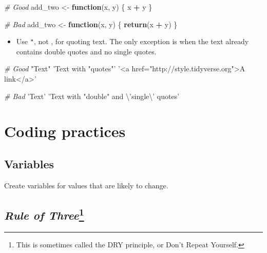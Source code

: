 \documentclass[]{book}
\newenvironment{Shaded}{\begin{snugshade}}{\end{snugshade}}
\newcommand{\KeywordTok}[1]{\textcolor[rgb]{0.13,0.29,0.53}{\textbf{#1}}}
\newcommand{\CharTok}[1]{\textcolor[rgb]{0.31,0.60,0.02}{#1}}
\newcommand{\StringTok}[1]{\textcolor[rgb]{0.31,0.60,0.02}{#1}}
\newcommand{\CommentTok}[1]{\textcolor[rgb]{0.56,0.35,0.01}{\textit{#1}}}
\newcommand{\ControlFlowTok}[1]{\textcolor[rgb]{0.13,0.29,0.53}{\textbf{#1}}}
\newcommand{\OperatorTok}[1]{\textcolor[rgb]{0.81,0.36,0.00}{\textbf{#1}}}
\newcommand{\NormalTok}[1]{#1}
\providecommand{\tightlist}{%
  \setlength{\itemsep}{0pt}\setlength{\parskip}{0pt}}
\let\rmarkdownfootnote\footnote%
\def\footnote{\protect\rmarkdownfootnote}
\theoremstyle{definition}
\theoremstyle{definition}
\theoremstyle{definition}
\theoremstyle{remark}
\begin{document}
\begin{Shaded}
\begin{Highlighting}[]
\CommentTok{# Good}
\NormalTok{add_two <-}\StringTok{ }\ControlFlowTok{function}\NormalTok{(x, y) \{}
\NormalTok{  x }\OperatorTok{+}\StringTok{ }\NormalTok{y}
\NormalTok{\}}

\CommentTok{# Bad}
\NormalTok{add_two <-}\StringTok{ }\ControlFlowTok{function}\NormalTok{(x, y) \{}
  \KeywordTok{return}\NormalTok{(x }\OperatorTok{+}\StringTok{ }\NormalTok{y)}
\NormalTok{\}}
\end{Highlighting}
\end{Shaded}

\begin{itemize}
\tightlist
\item
  Use \texttt{"}, not \texttt{\textquotesingle{}}, for quoting text. The
  only exception is when the text already contains double quotes and no
  single quotes.
\end{itemize}

\begin{Shaded}
\begin{Highlighting}[]
\CommentTok{# Good}
\StringTok{"Text"}
\StringTok{'Text with "quotes"'}
\StringTok{'<a href="http://style.tidyverse.org">A link</a>'}

\CommentTok{# Bad}
\StringTok{'Text'}
\StringTok{'Text with "double" and }\CharTok{\textbackslash{}'}\StringTok{single}\CharTok{\textbackslash{}'}\StringTok{ quotes'}
\end{Highlighting}
\end{Shaded}

\section{Coding practices}\label{coding-practices}

\subsection{Variables}\label{variables}

Create variables for values that are likely to change.

\subsection[\emph{Rule of Three}]{\texorpdfstring{\emph{Rule of
Three}\footnote{This is sometimes called the DRY principle, or Don't
  Repeat Yourself.}}{Rule of Three}}\label{rule-of-threedry}
\end{document}
